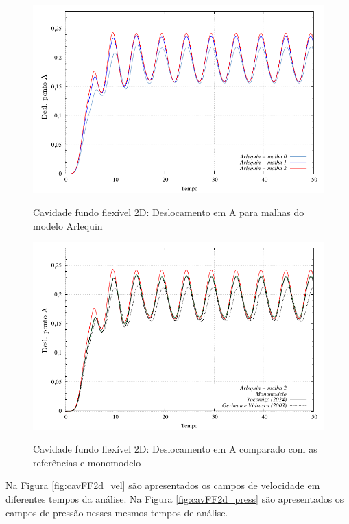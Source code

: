 \begin{figure}[!htbp]
	\caption{Cavidade fundo flexível 2D: Deslocamento em A para malhas do modelo Arlequin}
	\centering 
	\includegraphics[scale=0.8,trim=0cm 0cm 0cm 0cm, clip=true]{Imagens/Cap7/cavFF2d_Arlq_deslA.pdf}	
	\label{fig:cavFF2d_Arlq_deslA}
\end{figure}
\begin{figure}[!htbp]
	\caption{Cavidade fundo flexível 2D: Deslocamento em A comparado com as referências e monomodelo}
	\centering 
	\includegraphics[scale=0.8,trim=0cm 0cm 0cm 0cm, clip=true]{Imagens/Cap7/cavFF2d_deslA.pdf}	
	\label{fig:cavFF2d_deslA}
\end{figure}

Na Figura \ref{fig:cavFF2d_vel} são apresentados os campos de velocidade em diferentes tempos da análise. Na Figura \ref{fig:cavFF2d_press} são apresentados os campos de pressão nesses mesmos tempos de análise.

